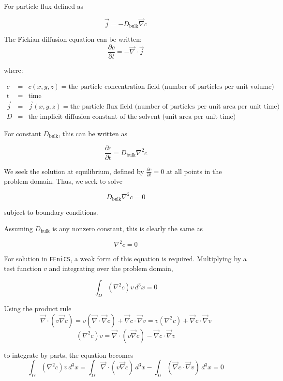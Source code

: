 \documentclass{article}
\begin{document}
For particle flux defined as 

$$\vec{j} = - D_{\text{bulk}} \vec{\nabla} c$$

The Fickian diffusion equation can be written:
$$\frac{\partial c}{\partial t} = - \vec{\nabla} \cdot \vec{j}$$

where:

$\begin{array}{rcl}
c & = & c(x,y,z) = \text{the particle concentration field (number of particles per unit volume)} \\
t & = & \text{time} \\
\vec{j} & = & \vec{j}(x,y,z) = \text{the particle flux field (number of particles per unit area per unit time)} \\
D & = & \text{the implicit diffusion constant of the solvent (unit area per unit time)}
\end{array}$

For constant $D_{\text{bulk}}$, this can be written as

$$\frac{\partial c}{\partial t} = D_{\text{bulk}} \nabla^2 c$$

We seek the solution at equilibrium, defined by
$\frac{\partial c}{\partial t} = 0$ at all points in the problem domain.
Thus, we seek to solve

$$D_{\text{bulk}} \nabla^2 c = 0$$

subject to boundary conditions.

Assuming $D_{\text{bulk}}$ is any nonzero constant, this is clearly the same as

$$ \nabla^2 c = 0$$

For solution in \texttt{FEniCS}, a weak form of this equation is required.
Multiplying by a test function $v$ and integrating over the problem domain,

$$\int_{\Omega} \left(\nabla^2 c \right) v \,d^3x = 0$$

Using the product rule
$$\vec{\nabla} \cdot \left( v \vec{\nabla} c \right) =
v \left(\vec{\nabla} \cdot \vec{\nabla} c \right) + \vec{\nabla}c \cdot \vec{\nabla}v =
v \left(\nabla^2 c \right) + \vec{\nabla}c \cdot \vec{\nabla}v$$
$$\left(\nabla^2 c \right) v =
\vec{\nabla} \cdot \left( v \vec{\nabla} c \right) - \vec{\nabla}c \cdot \vec{\nabla}v$$

to integrate by parts, the equation becomes
$$ \int_{\Omega} \left(\nabla^2 c \right) v \,d^3x =
\int_{\Omega} \vec{\nabla} \cdot \left( v \vec{\nabla} c \right) \,d^3x
- \int_{\Omega} \left( \vec{\nabla}c \cdot \vec{\nabla}v \right) \,d^3x =0$$
\end{document}
